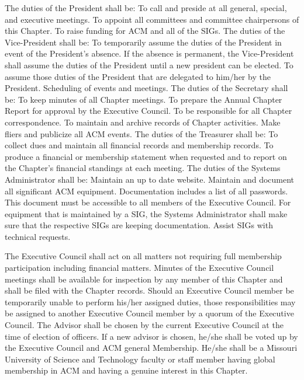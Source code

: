 \documentclass[11pt,a4paper,notitlepage]{article}
\begin{document}
The duties of the President shall be: To call and preside at all general,
special, and executive meetings. To appoint all committees and committee
chairpersons of this Chapter. To raise funding for ACM and all of the SIGs. The
duties of the Vice-President shall be: To temporarily assume the duties of the
President in event of the President's absence. If the absence is permanent, the
Vice-President shall assume the duties of the President until a new president
can be elected. To assume those duties of the President that are delegated to
him/her by the President. Scheduling of events and meetings. The duties of the
Secretary shall be: To keep minutes of all Chapter meetings. To prepare the
Annual Chapter Report for approval by the Executive Council. To be responsible
for all Chapter correspondence. To maintain and archive records of Chapter
activities. Make fliers and publicize all ACM events. The duties of the
Treasurer shall be: To collect dues and maintain all financial records and
membership records. To produce a financial or membership statement when
requested and to report on the Chapter's financial standings at each meeting.
The duties of the Systems Administrator shall be: Maintain an up to date
website. Maintain and document all significant ACM equipment. Documentation
includes a list of all passwords. This document must be accessible to all
members of the Executive Council. For equipment that is maintained by a SIG, the
Systems Administrator shall make sure that the respective SIGs are keeping
documentation. Assist SIGs with technical requests. 



The Executive Council shall act on all matters not requiring full membership
participation including financial matters. Minutes of the Executive Council
meetings shall be available for inspection by any member of this Chapter and
shall be filed with the Chapter records. Should an Executive Council member be
temporarily unable to perform his/her assigned duties, those responsibilities
may be assigned to another Executive Council member by a quorum of the Executive
Council. The Advisor shall be chosen by the current Executive Council at the
time of election of officers. If a new advisor is chosen, he/she shall be voted
up by the Executive Council and ACM general Membership. He/she shall be a
Missouri University of Science and Technology faculty or staff member having
global membership in ACM and having a genuine interest in this Chapter.
\end{document}
